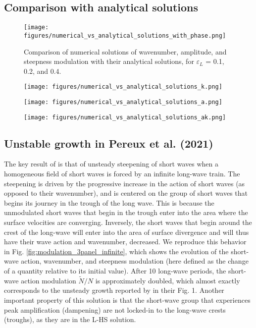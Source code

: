 \documentclass[lineno]{jfm}
\begin{document}
\subsection{Comparison with analytical solutions}
\label{subsection:comparison_with_analytical_solutions}

\begin{figure}
\centering
\texttt{[image: figures/numerical\_vs\_analytical\_solutions\_with\_phase.png]}
\caption{
  Comparison of numerical solutions of wavenumber, amplitude, and steepness modulation
  with their analytical solutions, for $\varepsilon_L$ = 0.1, 0.2, and 0.4.
}
\label{fig:numerical_solutions}
\end{figure}

\begin{figure}
\centering
\texttt{[image: figures/numerical\_vs\_analytical\_solutions\_k.png]}
\caption{}
\label{fig:numerical_vs_analytical_k}
\end{figure}

\begin{figure}
\centering
\texttt{[image: figures/numerical\_vs\_analytical\_solutions\_a.png]}
\caption{}
\label{fig:numerical_vs_analytical_a}
\end{figure}

\begin{figure}
\centering
\texttt{[image: figures/numerical\_vs\_analytical\_solutions\_ak.png]}
\caption{}
\label{fig:numerical_vs_analytical_ak}
\end{figure}

\subsection{Unstable growth in Pereux et al. (2021)}
\label{subsection:unstable_growth}

The key result of \citet{peureux2021unsteady} is that of unsteady steepening of
short waves when a homogeneous field of short waves is forced by an infinite
long-wave train.
The steepening is driven by the progressive increase in the action of short
waves (as opposed to their wavenumber), and is centered on the group of short
waves that begins its journey in the trough of the long wave.
This is because the unmodulated short waves that begin in the trough enter into
the area where the surface velocities are converging.
Inversely, the short waves that begin around the crest of the long-wave will
enter into the area of surface divergence and will thus have their wave action
and wavenumber, decreased.
We reproduce this behavior in Fig. \ref{fig:modulation_3panel_infinite}, which
shows the evolution of the short-wave action, wavenumber, and steepness
modulation (here defined as the change of a quantity relative to its initial value).
After 10 long-wave periods, the short-wave action modulation $\widetilde{N}/N$
is approximately doubled, which almost exactly corresponds to the unsteady growth
reported by \citet{peureux2021unsteady} in their Fig. 1.
Another important property of this solution is that the short-wave group that
experiences peak amplification (dampening) are not locked-in to the long-wave
crests (troughs), as they are in the L-HS solution.
\end{document}
